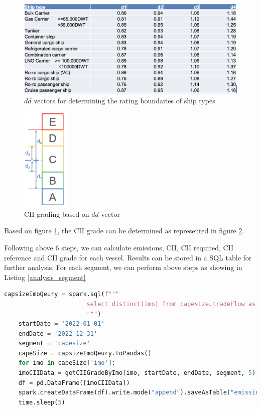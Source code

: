 \begin{figure}[h]
    \centering
    \includegraphics[width=1\textwidth]{images/dd_vecotor.png}
    \caption{$dd$ vectors for determining the rating boundaries of ship types}
    \label{dd_vecotor}
\end{figure}

\begin{figure}[h]
    \centering
    \includegraphics[width=0.2\textwidth]{images/cii_grade_dd_grade.png}
    \caption{CII grading based on $dd$ vector}
    \label{cii_grade_dd_grade}
\end{figure}

Based on figure \ref{dd_vecotor}, the CII grade can be determined as represented in figure \ref{cii_grade_dd_grade}.


Following above 6 steps, we can calculate emissions, CII, CII required, CII reference and CII grade for each vessel.
Results can be stored in a SQL table for further analysis.
For each segment, we can perform above steps as showing in Listing \ref{analysis_segment}

\begin{lstlisting}[language=python, caption=Analysis for capsize segment, label=analysis_segment]
    capsizeImoQeury = spark.sql(f"""
                       select distinct(imo) from capesize.tradeFlow as st
                       """)
    startDate = '2022-01-01'
    endDate = '2022-12-31'
    segment = 'capesize'
    capeSize = capsizeImoQeury.toPandas()
    for imo in capeSize['imo']:
    imoCIIData = getCIIGradeByImo(imo, startDate, endDate, segment, 5)
    df = pd.DataFrame([imoCIIData])
    spark.createDataFrame(df).write.mode("append").saveAsTable("emissions.capesize_cii_2022_v3")
    time.sleep(5)
\end{lstlisting}

